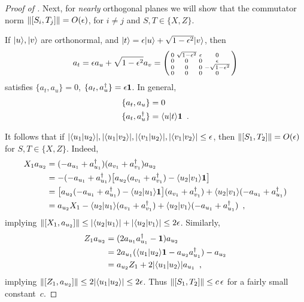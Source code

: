 \documentclass[preprintnumbers,11pt,onecolumn]{article}
\begin{document}
\begin{proof}[Proof of ]
Next, for \emph{nearly} orthogonal planes we will show that the commutator norm ${\| [S_i, T_j] \|} = O(\epsilon)$, for $i\neq j$ and $S,T\in\{X,Z\}$.  

If ${|u\rangle}, {|v\rangle}$ are orthonormal, and ${|t\rangle} = \epsilon {|u\rangle} + \sqrt{1-\epsilon^2} {|v\rangle}$, then 
\begin{equation*}
a_t = \epsilon a_u + \sqrt{1 - \epsilon^2} a_v = \left(\begin{smallmatrix}0&\sqrt{1-\epsilon^2}&\epsilon&0\\0&0&0&\epsilon\\0&0&0&-\sqrt{1-\epsilon^2}\\0&0&0&0\end{smallmatrix}\right)
\end{equation*}
satisfies $\{a_t, a_u\} = 0$, $\{a_t, a_u^\dagger\} = \epsilon \boldsymbol{1}$.  In general, 
\begin{align*}
\{a_t, a_u\} &= 0 \\
\{a_t, a_u^\dagger\} &= {\langle u|t\rangle} \boldsymbol{1}
 \enspace .
\end{align*}

It follows that if ${\lvert {\langle u_1|u_2\rangle}\rvert}, {\lvert {\langle u_1|v_2\rangle}\rvert}, {\lvert {\langle v_1|u_2\rangle}\rvert}, {\lvert {\langle v_1|v_2\rangle}\rvert} \leq \epsilon$, then ${\| [S_1, T_2] \|} = O(\epsilon)$ for $S,T\in\{X,Z\}$.  Indeed, 
\begin{align*}
X_1 a_{u_2}
&= (-a_{u_1} + a_{u_1}^\dagger)(a_{v_1} + a_{v_1}^\dagger) a_{u_2} \\
&= -(-a_{u_1} + a_{u_1}^\dagger) \big[ a_{u_2} (a_{v_1} + a_{v_1}^\dagger) - {\langle u_2|v_1\rangle} \boldsymbol{1} \big] \\
&= \big[ a_{u_2} (-a_{u_1} + a_{u_1}^\dagger) - {\langle u_2|u_1\rangle} \boldsymbol{1} \big] (a_{v_1} + a_{v_1}^\dagger) + {\langle u_2|v_1\rangle} (-a_{u_1} + a_{u_1}^\dagger) \\
&= a_{u_2} X_1 - {\langle u_2|u_1\rangle} (a_{v_1} + a_{v_1}^\dagger) + {\langle u_2|v_1\rangle} (-a_{u_1} + a_{u_1}^\dagger)
 \enspace ,
\end{align*}
implying ${\| [X_1, a_{u_2}] \|} \leq {\lvert {\langle u_2|u_1\rangle}\rvert} + {\lvert {\langle u_2|v_1\rangle}\rvert} \leq 2 \epsilon$.  Similarly, 
\begin{align*}
Z_1 a_{u_2} 
&= (2 a_{u_1} a_{u_1}^\dagger - \boldsymbol{1}) a_{u_2} \\
&= 2 a_{u_1} ({\langle u_1|u_2\rangle} \boldsymbol{1} - a_{u_2} a_{u_1}^\dagger) - a_{u_2} \\
&= a_{u_2} Z_1 + 2 {\lvert {\langle u_1|u_2\rangle}\rvert} a_{u_1}
 \enspace ,
\end{align*}
implying ${\| [Z_1, a_{u_2}] \|} \leq 2 {\lvert {\langle u_1|u_2\rangle}\rvert} \leq 2 \epsilon$.  Thus ${\| [S_1, T_2] \|} \leq c \, \epsilon$ for a fairly small constant~$c$.  
\end{proof}
\end{document}
